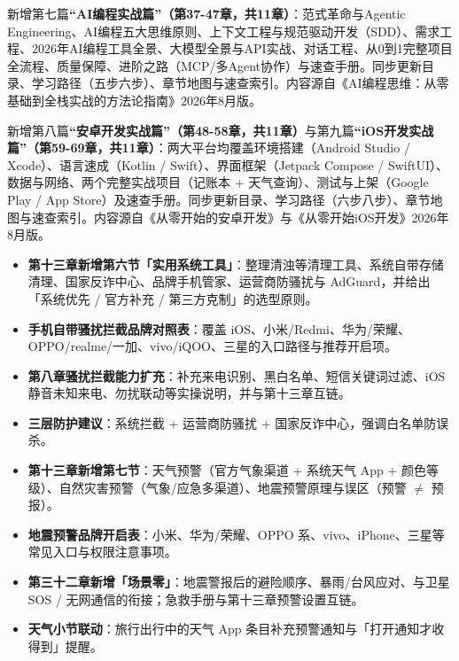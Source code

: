 
新增第七篇\textbf{“AI编程实战篇”（第37-47章，共11章）}：范式革命与Agentic Engineering、AI编程五大思维原则、上下文工程与规范驱动开发（SDD）、需求工程、2026年AI编程工具全景、大模型全景与API实战、对话工程、从0到1完整项目全流程、质量保障、进阶之路（MCP/多Agent协作）与速查手册。同步更新目录、学习路径（五步六步）、章节地图与速查索引。内容源自《AI编程思维：从零基础到全栈实战的方法论指南》2026年8月版。

新增第八篇\textbf{“安卓开发实战篇”（第48-58章，共11章）}与第九篇\textbf{“iOS开发实战篇”（第59-69章，共11章）}：两大平台均覆盖环境搭建（Android Studio / Xcode）、语言速成（Kotlin / Swift）、界面框架（Jetpack Compose / SwiftUI）、数据与网络、两个完整实战项目（记账本 + 天气查询）、测试与上架（Google Play / App Store）及速查手册。同步更新目录、学习路径（六步八步）、章节地图与速查索引。内容源自《从零开始的安卓开发》与《从零开始iOS开发》2026年8月版。


\begin{itemize}
  \item \textbf{第十三章新增第六节「实用系统工具」}：整理清浊等清理工具、系统自带存储清理、国家反诈中心、品牌手机管家、运营商防骚扰与 AdGuard，并给出「系统优先 / 官方补充 / 第三方克制」的选型原则。
  \item \textbf{手机自带骚扰拦截品牌对照表}：覆盖 iOS、小米/Redmi、华为/荣耀、OPPO/realme/一加、vivo/iQOO、三星的入口路径与推荐开启项。
  \item \textbf{第八章骚扰拦截能力扩充}：补充来电识别、黑白名单、短信关键词过滤、iOS 静音未知来电、勿扰联动等实操说明，并与第十三章互链。
  \item \textbf{三层防护建议}：系统拦截 + 运营商防骚扰 + 国家反诈中心，强调白名单防误杀。
\end{itemize}


\begin{itemize}
  \item \textbf{第十三章新增第七节}：天气预警（官方气象渠道 + 系统天气 App + 颜色等级）、自然灾害预警（气象/应急多渠道）、地震预警原理与误区（预警 $\neq$ 预报）。
  \item \textbf{地震预警品牌开启表}：小米、华为/荣耀、OPPO 系、vivo、iPhone、三星等常见入口与权限注意事项。
  \item \textbf{第三十二章新增「场景零」}：地震警报后的避险顺序、暴雨/台风应对、与卫星 SOS / 无网通信的衔接；急救手册与第十三章预警设置互链。
  \item \textbf{天气小节联动}：旅行出行中的天气 App 条目补充预警通知与「打开通知才收得到」提醒。
\end{itemize}

